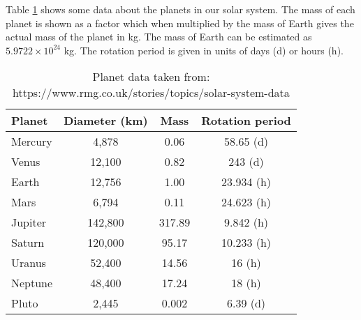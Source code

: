 \documentclass[11pt]{report}
\begin{document}
\begin{Exercise}[title=Modelling using data structures]
    
    Table \ref{tab:planets} shows some data about the planets in our solar system. The mass of each planet is shown as a factor which when multiplied by the mass of Earth gives the actual mass of the planet in kg. The mass of Earth can be estimated as $5.9722 \times 10^{24}$ kg. The rotation period is given in units of days (d) or hours (h). 
    \begin{table}
    \begin{center}
    \begin{tabular}{ |l|c|c|c| } 
     \hline
     Planet  & Diameter (km) & Mass  & Rotation period \\
     \hline
     Mercury & 4,878           & 0.06  & 58.65 (d) \\ 
     Venus   & 12,100          & 0.82  & 243 (d) \\  
     Earth   & 12,756          & 1.00  & 23.934 (h) \\ 
     Mars    & 6,794          & 0.11  & 24.623 (h) \\ 
     Jupiter & 142,800          & 317.89& 9.842  (h) \\ 
     Saturn  & 120,000          & 95.17 & 10.233 (h) \\ 
     Uranus  & 52,400          & 14.56 & 16 (h) \\ 
     Neptune & 48,400          & 17.24 & 18 (h) \\ 
     Pluto   & 2,445          & 0.002 & 6.39 (d) \\ 
     \hline
    \end{tabular}
    \vspace{0.5em}
    
    \caption{\label{tab:planets} Planet data taken from: https://www.rmg.co.uk/stories/topics/solar-system-data}
    \end{center}
    \end{table}
    
    
    
\end{Exercise}


\begin{Exercise}[title=Sorting lists]

	
	
	
\end{Exercise}
\end{document}
